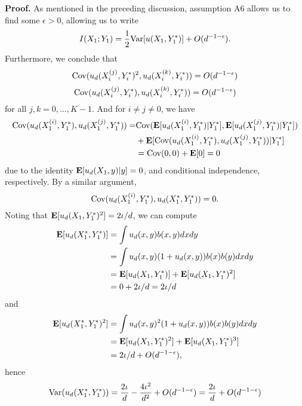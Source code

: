 \documentclass[12pt]{article}
\begin{document}
\textbf{Proof. }
As mentioned in the preceding discussion, assumption A6 allows us to
find some $\epsilon > 0$, allowing us to write
\[
I(X_1; Y_1) = \frac{1}{2}\text{Var}[u(X_1,Y_1^*)] + O(d^{-1 - \epsilon}).
\]
Furthermore, we conclude that
\[
\text{Cov}(u_d(X_i^{(j)}, Y_i^*)^2, u_d(X_i^{(k)}, Y_i^*)) = O(d^{-1-\epsilon})
\]
\[
\text{Cov}(u_d(X_i^{(j)}, Y_i^*), u_d(X_i^{(k)}, Y_i^*)) = O(d^{-1-\epsilon})
\]
for all $j, k = 0,\hdots, K-1$.
And for $i \neq j \neq 0$, we have
\begin{align*}
\text{Cov}(u_d(X_1^{(i)}, Y_1^*), u_d(X_1^{(j)}, Y_1^*)) 
=& \text{Cov}(\textbf{E}[u_d(X_1^{(i)}, Y_1^*)|Y_1^*], \textbf{E}[u_d(X_1^{(j)}, Y_1^*)|Y_1^*]) 
\\&+ \textbf{E}[\text{Cov}(u_d(X_1^{(i)}, Y_1^*), u_d(X_1^{(j)}, Y_1^*))|Y_1^*]
\\&= \text{Cov}(0, 0) + \textbf{E}[0] = 0
\end{align*}
due to the identity $\textbf{E}[u_d(X_1,y)|y] = 0$, and conditional independence, respectively.
By a similar argument,
\[
\text{Cov}(u_d(X_1^{(i)}, Y_1^*), u_d(X_1^*, Y_1^*))  = 0.
\]
Noting that $\textbf{E}[u_d(X_1,Y_1^*)^2] = 2\iota/d$,
we can compute
\begin{align*}
\textbf{E}[u_d(X_1^*, Y_1^*)] &= \int u_d(x, y)b(x,y) dx dy
\\&= \int u_d(x, y)(1 + u_d(x, y))b(x)b(y) dx dy
\\&= \textbf{E}[u_d(X_1, Y_1^*)] + \textbf{E}[u_d(X_1, Y_1^*)^2]
\\&= 0 + 2\iota/d = 2\iota/d
\end{align*}
and
\begin{align*}
\textbf{E}[u_d(X_1^*, Y_1^*)^2] &= \int u_d(x, y)^2(1 + u_d(x, y))b(x)b(y) dx dy
\\&= \textbf{E}[u_d(X_1, Y_1^*)^2] + \textbf{E}[u_d(X_1, Y_1^*)^3]
\\&= 2\iota/d + O(d^{-1-\epsilon}),
\end{align*}
hence
\[
\text{Var}(u_d(X_1^*, Y_1^*)) = \frac{2\iota}{d} - \frac{4\iota^2}{d^2} + O(d^{-1-\epsilon}) = 
\frac{2\iota}{d}+ O(d^{-1-\epsilon})
\]
\end{document}
